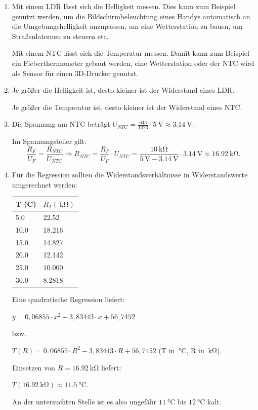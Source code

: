\documentclass[ngerman, 11pt]{scrreprt}
\begin{document}
	\begin{enumerate}[label=\alph*), itemsep=0mm, parsep=0mm]
		\item Mit einem LDR lässt sich die Helligkeit messen. Dies kann zum Beispiel genutzt werden, um die Bildschirmbeleuchtung eines Handys automatisch an die Umgebungshelligkeit anzupassen, um eine Wetterstation zu bauen, um Straßenlaternen zu steuern etc.
		
		Mit einem NTC lässt sich die Temperatur messen. Damit kann zum Beispiel ein Fieberthermometer gebaut werden, eine Wetterstation oder der NTC wird als Sensor für einen 3D-Drucker genutzt.
		\item Je größer die Helligkeit ist, desto kleiner ist der Widerstand eines LDR.
		
		Je größer die Temperatur ist, desto kleiner ist der Widerstand eines NTC.
		\item Die Spannung am NTC beträgt $U_{NTC}= \frac{643}{1023}\cdot \SI{5}{\volt} \approx \SI{3,14}{\volt}$.
		
		Im Spannungsteiler gilt:
		\begin{equation*}
			\frac{R_F}{U_F} = \frac{R_{NTC}}{U_{NTC}} \Rightarrow R_{NTC} = \frac{R_F}{U_F} \cdot U_{NTC} = \frac{\SI{10}{\kilo\ohm}}{\SI{5}{\volt}-\SI{3,14}{\volt}} \cdot \SI{3,14}{\volt} \approx \SI{16,92}{\kilo\ohm}.
		\end{equation*}
		\item Für die Regression sollten die Widerstandsverhältnisse in Widerstandswerte umgerechnet werden:
		
		\smallskip
		\begin{tabular}{l | l }
			T (C) & $R_T (\SI{}{\kilo\ohm})$ \\ \hline
			5.0 & 22.52 \\ \hline
			10.0 & 18.216 \\ \hline
			15.0 & 14.827 \\ \hline
			20.0 & 12.142 \\ \hline
			25.0 & 10.000 \\ \hline
			30.0 & 8.2818 \\ \hline
		\end{tabular}
		
		\smallskip
		Eine quadratische Regression liefert: 
		
		$y=0,06855\cdot x^2 -3,83443\cdot x + 56,7452$ 
		
		bzw. 
		
		$T(R)=0,06855\cdot R^2 -3,83443\cdot R + 56,7452$ (T in $\SI{}{\celsius}$, R in $\SI{}{\kilo\ohm}$).
		
		Einsetzen von $R=\SI{16,92}{\kilo\ohm}$ liefert:
		
		$T(\SI{16,92}{\kilo\ohm}) \approx \SI{11,5}{\celsius} $.
		
		An der untersuchten Stelle ist es also ungefähr $\SI{11}{\celsius}$ bis $\SI{12}{\celsius}$ kalt.
	\end{enumerate}
	
\end{document}
